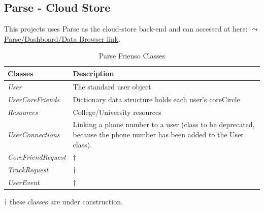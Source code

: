 \subsection{Parse - Cloud Store}
This projects uses Parse as the cloud-store back-end and can accessed at here: 
\href{https://www.parse.com/apps/frienso--2/collections}{$\leadsto$ Parse/Dashboard/Data Browser 
link}.

\begin{table}[ht!]%
	\caption{Parse Frienso Classes \label{tab:table_label}}
	\begin{tabularx}{\linewidth}{ l X }
	\textbf{Classes} & \textbf{Description} \\\hline
	\emph{User}  & The standard user object \\
	\emph{UserCoreFriends}  & Dictionary data structure holds each user's coreCircle \\
	\emph{Resources}        & College/University resources \\
	\emph{UserConnections}	& Linking a phone number to a user (class to be deprecated,
	because the phone number has been added to the User class).\\
	\emph{CoreFriendRequest}& $\dagger$\\
	\emph{TrackRequest} 	& $\dagger$\\
	\emph{UserEvent} 		& $\dagger$\\
	\end{tabularx}\end{table}%

\noindent \textbf{$\dagger$} these classes are under construction.



